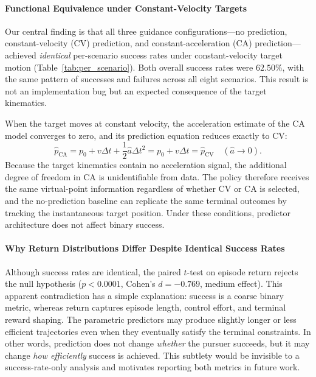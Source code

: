 
\paragraph{Functional Equivalence under Constant-Velocity Targets}
Our central finding is that all three guidance configurations---no prediction, constant-velocity (CV) prediction, and constant-acceleration (CA) prediction---achieved \emph{identical} per-scenario success rates under constant-velocity target motion (Table~\ref{tab:per_scenario}). Both overall success rates were $62.50\%$, with the same pattern of successes and failures across all eight scenarios. This result is not an implementation bug but an expected consequence of the target kinematics.

When the target moves at constant velocity, the acceleration estimate of the CA model converges to zero, and its prediction equation reduces exactly to CV:
\begin{equation}
\hat{p}_{\text{CA}} = p_0 + v\Delta t + \frac{1}{2}\hat{a}\Delta t^2 = p_0 + v\Delta t = \hat{p}_{\text{CV}} \quad (\hat{a} \to 0).
\end{equation}
Because the target kinematics contain no acceleration signal, the additional degree of freedom in CA is unidentifiable from data. The policy therefore receives the same virtual-point information regardless of whether CV or CA is selected, and the no-prediction baseline can replicate the same terminal outcomes by tracking the instantaneous target position. Under these conditions, predictor architecture does not affect binary success.

\paragraph{Why Return Distributions Differ Despite Identical Success Rates}
Although success rates are identical, the paired $t$-test on episode return rejects the null hypothesis ($p < 0.0001$, Cohen's $d = -0.769$, medium effect). This apparent contradiction has a simple explanation: success is a coarse binary metric, whereas return captures episode length, control effort, and terminal reward shaping. The parametric predictors may produce slightly longer or less efficient trajectories even when they eventually satisfy the terminal constraints. In other words, prediction does not change \emph{whether} the pursuer succeeds, but it may change \emph{how efficiently} success is achieved. This subtlety would be invisible to a success-rate-only analysis and motivates reporting both metrics in future work.

